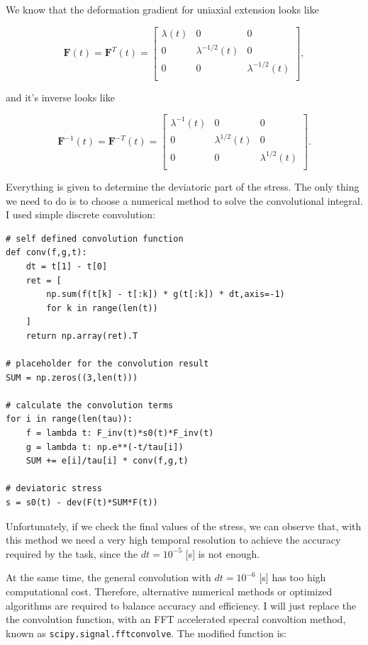 \documentclass[12pt,a4paper]{article}
\begin{document}
We know that the deformation gradient for uniaxial extension looks like

\begin{equation}
\boldsymbol{F}(t) = \boldsymbol{F}^T(t) = 
\begin{bmatrix}
    \lambda(t) & 0 & 0\\
    0&\lambda^{-1/2}(t)&0\\
    0&0&\lambda^{-1/2}(t)\\
\end{bmatrix},
\end{equation}

and it's inverse looks like

\begin{equation}
\boldsymbol{F}^{-1}(t) =  \boldsymbol{F}^{-T}(t)=
\begin{bmatrix}
    \lambda^{-1}(t) & 0 & 0\\
    0&\lambda^{1/2}(t)&0\\
    0&0&\lambda^{1/2}(t)\\
\end{bmatrix}.
\end{equation}

Everything is given to determine the deviatoric part of the stress. The only thing we need to do is to choose a numerical method to solve the convolutional integral. I used simple discrete convolution:

\lstset{style=python}
\begin{lstlisting}
# self defined convolution function
def conv(f,g,t):
    dt = t[1] - t[0]
    ret = [
        np.sum(f(t[k] - t[:k]) * g(t[:k]) * dt,axis=-1) 
        for k in range(len(t))
    ]
    return np.array(ret).T

# placeholder for the convolution result
SUM = np.zeros((3,len(t)))

# calculate the convolution terms
for i in range(len(tau)):
    f = lambda t: F_inv(t)*s0(t)*F_inv(t)
    g = lambda t: np.e**(-t/tau[i])
    SUM += e[i]/tau[i] * conv(f,g,t)

# deviatoric stress
s = s0(t) - dev(F(t)*SUM*F(t))
\end{lstlisting}


\newpage

Unfortunately, if we check the final values of the stress, we can observe that, with this method we need a very high temporal resolution to achieve the accuracy required by the task, since the $dt=10^{-5}$ [s] is not enough. 

At the same time, the general convolution with  $dt=10^{-6}$ [s] has too high computational cost. Therefore, alternative numerical methods or optimized algorithms are required to balance accuracy and efficiency. I will just replace the the convolution function, with an FFT accelerated specral convoltion method, known as \texttt{scipy.signal.fftconvolve}. The modified function is:
\end{document}

